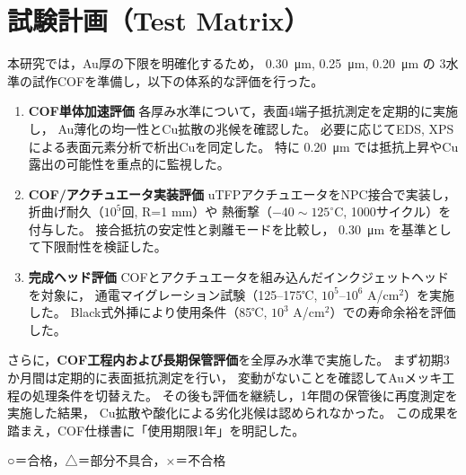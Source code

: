 \documentclass[conference]{IEEEtran}
\begin{document}
\section{試験計画（Test Matrix）}
本研究では，Au厚の下限を明確化するため，
\SI{0.30}{\micro\meter}, \SI{0.25}{\micro\meter}, \SI{0.20}{\micro\meter} の
3水準の試作COFを準備し，以下の体系的な評価を行った。

\begin{enumerate}
  \item \textbf{COF単体加速評価}  
        各厚み水準について，表面4端子抵抗測定を定期的に実施し，
        Au薄化の均一性とCu拡散の兆候を確認した。  
        必要に応じてEDS, XPSによる表面元素分析で析出Cuを同定した。  
        特に \SI{0.20}{\micro\meter} では抵抗上昇やCu露出の可能性を重点的に監視した。
  \item \textbf{COF/アクチュエータ実装評価}  
        uTFPアクチュエータをNPC接合で実装し，折曲げ耐久（$10^5$回, R=1 mm）や
        熱衝撃（$-40\sim125^\circ$C, 1000サイクル）を付与した。  
        接合抵抗の安定性と剥離モードを比較し，
        \SI{0.30}{\micro\meter} を基準として下限耐性を検証した。
  \item \textbf{完成ヘッド評価}  
        COFとアクチュエータを組み込んだインクジェットヘッドを対象に，
        通電マイグレーション試験（125--175℃, $10^5$--$10^6$ A/cm$^2$）を実施した。  
        Black式外挿により使用条件（85℃, $10^3$ A/cm$^2$）での寿命余裕を評価した。
\end{enumerate}

さらに，\textbf{COF工程内および長期保管評価}を全厚み水準で実施した。  
まず初期3か月間は定期的に表面抵抗測定を行い，
変動がないことを確認してAuメッキ工程の処理条件を切替えた。  
その後も評価を継続し，1年間の保管後に再度測定を実施した結果，
Cu拡散や酸化による劣化兆候は認められなかった。  
この成果を踏まえ，COF仕様書に「使用期限1年」を明記した。

\begin{table}[htbp]
  \centering
  \caption{評価試験マトリクス（Evaluation test matrix）}
  \label{tab:test-matrix}
  \vspace{2pt}
  \footnotesize{○＝合格，△＝部分不具合，×＝不合格}
\end{table}
\end{document}

